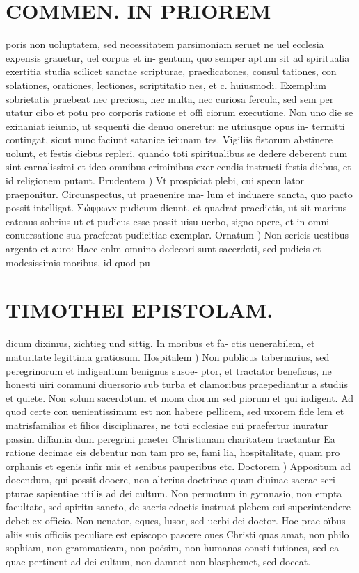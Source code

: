\documentclass{article}
\begin{document}
\begin{pages}
\section*{COMMEN. IN PRIOREM }
\marginpar{[ p.74 ]}\pstart poris non uoluptatem, sed necessitatem parsimoniam seruet ne uel ecclesia expensis grauetur, uel corpus et in- gentum, quo semper aptum sit ad spiritualia exertitia studia scilicet sanctae scripturae, praedicatones, consul tationes, con solationes, orationes, lectiones, scriptitatio nes, et c. huiusmodi. Exemplum sobrietatis praebeat nec preciosa, nec multa, nec curiosa fercula, sed sem per utatur cibo et potu pro corporis ratione et offi ciorum executione. Non uno die se exinaniat ieiunio, ut sequenti die denuo oneretur: ne utriusque opus in- termitti contingat, sicut nunc faciunt satanice ieiunam tes. Vigiliis fistorum abstinere uolunt, et festis diebus repleri, quando toti spiritualibus se dedere deberent cum sint carnalissimi et ideo omnibus criminibus exer cendis instructi festis diebus, et id religionem putant.  \pend\pstart Prudentem ) Vt prospiciat plebi, cui specu lator praeponitur. Circunspectus, ut praeuenire ma- lum et induaere sancta, quo pacto possit intelligat. Σώφρωνx pudicum dicunt, et quadrat praedictis, ut sit maritus eatenus sobrius ut et pudicus esse possit uisu uerbo, signo opere, et in omni conuersatione sua praeferat pudicitiae exemplar.  \pend\pstart Ornatum ) Non sericis uestibus argento et auro: Haec enlm omnino dedecori sunt sacerdoti, sed pudicis et modesissimis moribus, id quod pu-  \pend
\section*{TIMOTHEI EPISTOLAM. }
\marginpar{[ p.75 ]}\pstart dicum diximus, zichtieg und sittig. In moribus et fa- ctis uenerabilem, et maturitate legittima gratiosum.  \pend\pstart Hospitalem ) Non publicus tabernarius, sed peregrinorum et indigentium benignus susoe- ptor, et tractator beneficus, ne honesti uiri communi diuersorio sub turba et clamoribus praepediantur a studiis et quiete. Non solum sacerdotum et mona chorum sed piorum et qui indigent. Ad quod certe con uenientissimum est non habere pellicem, sed uxorem fide lem et matrisfamilias et filios disciplinares, ne toti ecclesiae cui praefertur inuratur passim diffamia dum peregrini praeter Christianam charitatem tractantur Ea ratione decimae eis debentur non tam pro se, fami lia, hospitalitate, quam pro orphanis et egenis infir mis et senibus pauperibus etc.  \pend\pstart Doctorem ) Appositum ad docendum, qui possit dooere, non alterius doctrinae quam diuinae sacrae scri pturae sapientiae utilis ad dei cultum. Non permotum in gymnasio, non empta facultate, sed spiritu sancto, de sacris edoctis instruat plebem cui superintendere debet ex officio. Non uenator, eques, lusor, sed uerbi dei doctor. Hoc prae oïbus aliis suis officiis peculiare est episcopo pascere oues Christi quas amat, non philo sophiam, non grammaticam, non poësim, non humanas consti tutiones, sed ea quae pertinent ad dei cultum, non damnet non blasphemet, sed doceat.  \pend

\end{pages}
\end{document}
